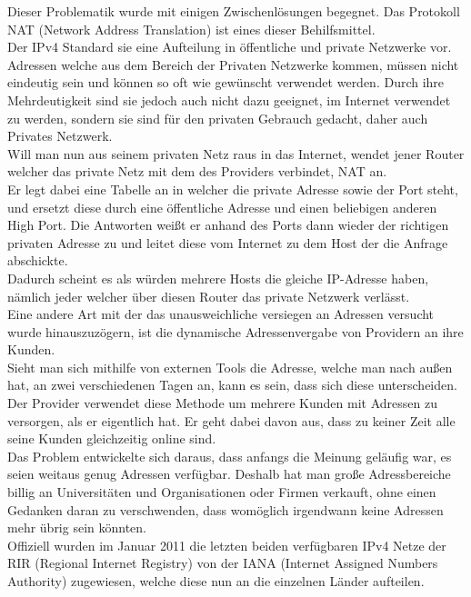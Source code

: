 \documentclass[11pt,a4paper]{report}
\begin{document}
Dieser Problematik wurde mit einigen Zwischenlösungen begegnet. Das Protokoll NAT (Network Address Translation) ist eines dieser Behilfsmittel.\\
Der IPv4 Standard sie eine Aufteilung in öffentliche und private Netzwerke vor. Adressen welche aus dem Bereich der Privaten Netzwerke kommen, müssen nicht eindeutig sein und können so oft wie gewünscht verwendet werden. Durch ihre Mehrdeutigkeit sind sie jedoch auch nicht dazu geeignet, im Internet verwendet zu werden, sondern sie sind für den privaten Gebrauch gedacht, daher auch Privates Netzwerk.\\
Will man nun aus seinem privaten Netz raus in das Internet, wendet jener Router welcher das private Netz mit dem des Providers verbindet, NAT an.\\
Er legt dabei eine Tabelle an in welcher die private Adresse sowie der Port steht, und ersetzt diese durch eine öffentliche Adresse und einen beliebigen anderen High Port. Die Antworten weißt er anhand des Ports dann wieder der richtigen privaten Adresse zu und leitet diese vom Internet zu dem Host der die Anfrage abschickte.\\
Dadurch scheint es als würden mehrere Hosts die gleiche IP-Adresse haben, nämlich jeder welcher über diesen Router das private Netzwerk verlässt.\\

Eine andere Art mit der das unausweichliche versiegen an Adressen versucht wurde hinauszuzögern, ist die dynamische Adressenvergabe von Providern an ihre Kunden.\\
Sieht man sich mithilfe von externen Tools die Adresse, welche man nach außen hat, an zwei verschiedenen Tagen an, kann es sein, dass sich diese unterscheiden.\\
Der Provider verwendet diese Methode um mehrere Kunden mit Adressen zu versorgen, als er eigentlich hat. Er geht dabei davon aus, dass zu keiner Zeit alle seine Kunden gleichzeitig online sind.\\

Das Problem entwickelte sich daraus, dass anfangs die Meinung geläufig war, es seien weitaus genug Adressen verfügbar. Deshalb hat man große Adressbereiche billig an Universitäten und Organisationen oder Firmen verkauft, ohne einen Gedanken daran zu verschwenden, dass womöglich irgendwann keine Adressen mehr übrig sein könnten.\\
Offiziell wurden im Januar 2011 die letzten beiden verfügbaren IPv4 Netze der RIR (Regional Internet Registry) von der IANA (Internet Assigned Numbers Authority) zugewiesen, welche diese nun an die einzelnen Länder aufteilen.\\
\end{document}

